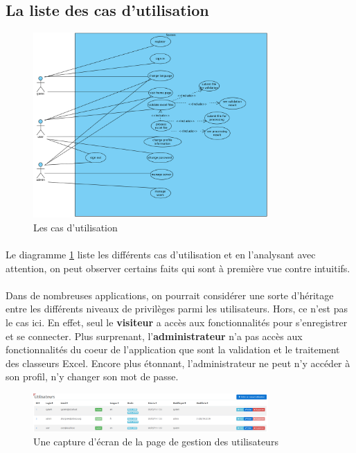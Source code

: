\subsection{La liste des cas d'utilisation}
\label{subsec:use-cases-list}

\begin{figure}[ht]
    \centering
    \includegraphics[width=0.8\textwidth]{images/diagrams/use-cases-macro.png}
    \caption{Les cas d'utilisation}
    \label{fig:use-cases-macro}
\end{figure}

\paragraph{}
Le diagramme \ref{fig:use-cases-macro} liste les différents cas d'utilisation et en l'analysant avec attention, on peut observer certains faits qui sont à première vue contre intuitifs.

\paragraph{}
Dans de nombreuses applications, on pourrait considérer une sorte d'héritage entre les différents niveaux de privilèges parmi les utilisateurs. Hors, ce n'est pas le cas ici. En effet, seul le \textbf{visiteur} a accès aux fonctionnalités pour s'enregistrer et se connecter. Plus surprenant, l'\textbf{administrateur} n'a pas accès aux fonctionnalités du coeur de l'application que sont la validation et le traitement des classeurs Excel. Encore plus étonnant, l'administrateur ne peut n'y accéder à son profil, n'y changer son mot de passe.

\begin{figure}[ht]
    \centering
    \includegraphics[width=0.8\textwidth]{images/screenshot/screenshot-user-admin-page.png}
    \caption{Une capture d'écran de la page de gestion des utilisateurs}
    \label{fig:user-admin-page}
\end{figure}

